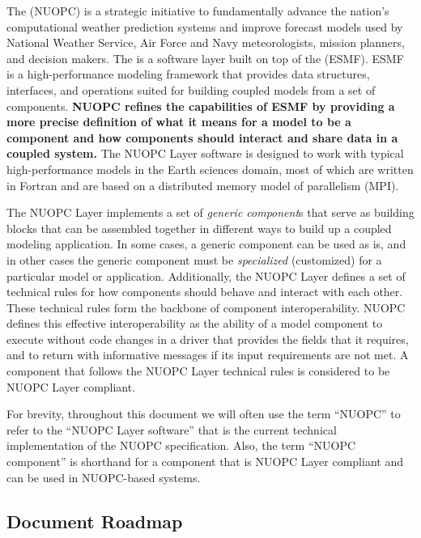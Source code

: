 
The 
(NUOPC) is a strategic initiative to fundamentally advance the nation's computational
weather prediction systems and improve forecast models used by National Weather Service,
Air Force and Navy meteorologists, mission planners, and decision makers.  The
 is
a software layer built on top of the
 (ESMF).
ESMF is a high-performance modeling framework that provides
data structures, interfaces, and operations suited for building coupled models
from a set of components.  \textbf{NUOPC refines the capabilities of
ESMF by providing a more precise definition of what it means for a model
to be a component and how components should interact and share data
in a coupled system.}  The NUOPC Layer software is designed to work
with typical high-performance models in the Earth sciences domain, most
of which are written in Fortran and are based on a distributed memory
model of parallelism (MPI).

The NUOPC Layer implements a set of \emph{generic component}s that
serve as building blocks that can be assembled together in different ways
to build up a coupled modeling application.  In some cases, a generic
component can be used as is, and in other cases the generic component
must be \emph{specialized} (customized) for a particular model or application.
Additionally, the NUOPC Layer defines a set of technical rules for how components
should behave and interact with each other.  These technical rules form the
backbone of component interoperability.  NUOPC defines this effective interoperability
as the ability of a model component to execute without code changes in a driver that
provides the fields that it requires, and to return with informative messages if its
input requirements are not met. A component that follows the NUOPC Layer technical
rules is considered to be NUOPC Layer compliant.

For brevity, throughout this document we will often use the
term ``NUOPC'' to refer to the ``NUOPC Layer software'' that is
the current technical implementation of the NUOPC specification.
Also, the term ``NUOPC component'' is shorthand for a component
that is NUOPC Layer compliant and can be used in NUOPC-based
systems.

\subsection{Document Roadmap}

